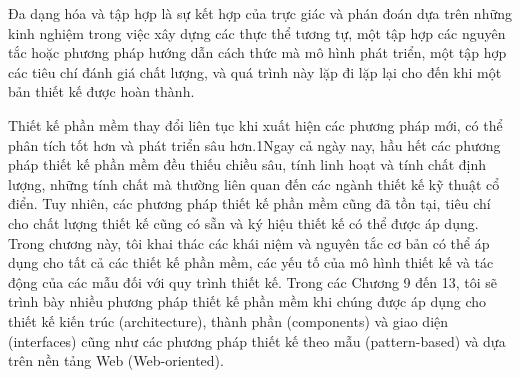 \documentclass[11pt,a4paper,oneside]{report}
\begin{document}
	Đa dạng hóa và tập hợp là sự kết hợp của trực giác và phán đoán dựa trên những kinh nghiệm trong việc xây dựng các thực thể tương tự, một tập hợp các nguyên tắc hoặc phương pháp hướng dẫn cách thức mà mô hình phát triển, một tập hợp các tiêu chí đánh giá chất lượng, và quá trình này lặp đi lặp lại cho đến khi một bản thiết kế được hoàn thành.
	
	Thiết kế phần mềm thay đổi liên tục khi xuất hiện các phương pháp mới, có thể phân tích tốt hơn và phát triển sâu hơn.1Ngay cả ngày nay, hầu hết các phương pháp thiết kế phần mềm đều thiếu chiều sâu, tính linh hoạt và tính chất định lượng, những tính chất mà thường liên quan đến các ngành thiết kế kỹ thuật cổ điển. Tuy nhiên, các phương pháp thiết kế phần mềm cũng đã tồn tại, tiêu chí cho chất lượng thiết kế cũng có sẵn và ký hiệu thiết kế có thể được áp dụng. Trong chương này, tôi khai thác các khái niệm và nguyên tắc cơ bản có thể áp dụng cho tất cả các thiết kế phần mềm, các yếu tố của mô hình thiết kế và tác động của các mẫu đối với quy trình thiết kế. Trong các Chương 9 đến 13, tôi sẽ trình bày nhiều phương pháp thiết kế phần mềm khi chúng được áp dụng cho thiết kế kiến trúc (architecture), thành phần (components) và giao diện (interfaces) cũng như các phương pháp thiết kế theo mẫu (pattern-based) và dựa trên nền tảng Web (Web-oriented).
	
	
	
	
	
	
	
	\printindex
	
	\printglossary[type=\acronymtype, title=Thuật ngữ viết tắt]
	
	\printglossary
	
	\nocite{*}
	\printbibliography[title=Tài liệu tham khảo]
	
	
\end{document}
